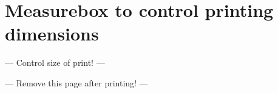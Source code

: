 \chapter*{Measurebox to control printing dimensions}



\begin{center}
{\Large --- Control size of print! ---}

\bigskip


\bigskip

{\Large --- Remove this page after printing! ---}

\end{center}

